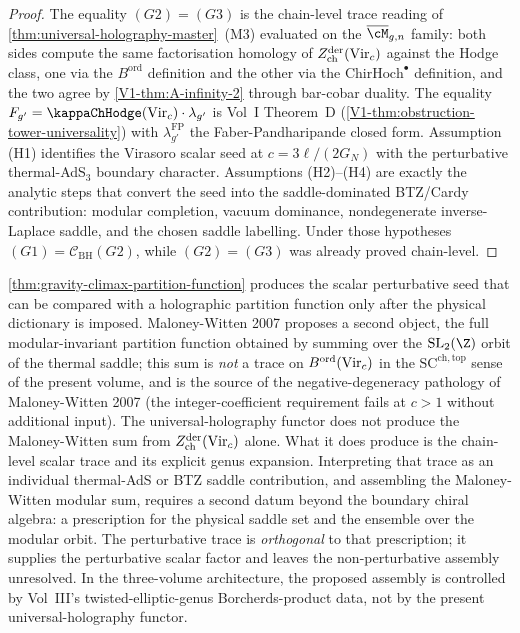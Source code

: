 \begin{proof}
The equality $(G2) = (G3)$ is the chain-level trace reading of
\cref{thm:universal-holography-master}~(M3) evaluated on the
$\overline{\cM}_{g, n}$ family: both sides compute the same factorisation
homology of $Z^{\mathrm{der}}_{\mathrm{ch}}(\mathrm{Vir}_{c})$ against the
Hodge class, one via the $B^{\mathrm{ord}}$ definition and the other
via the $\mathrm{ChirHoch}^{\bullet}$ definition, and the two agree by
\cref{V1-thm:A-infinity-2} through bar-cobar duality. The equality
	$F_{g'} = \kappaChHodge(\Vir_c) \cdot \lambda_{g'}$ is Vol~I Theorem~D
(\cref{V1-thm:obstruction-tower-universality}) with
$\lambda_{g'}^{\mathrm{FP}}$ the Faber-Pandharipande closed form.
Assumption \textup{(H1)} identifies the Virasoro scalar seed at
$c = 3\ell/(2G_N)$ with the perturbative thermal-AdS$_3$ boundary
character. Assumptions \textup{(H2)--(H4)} are exactly the analytic
steps that convert the seed into the saddle-dominated
BTZ/Cardy contribution: modular completion, vacuum dominance,
nondegenerate inverse-Laplace saddle, and the chosen saddle labelling.
Under those hypotheses \((G1)=\mathcal C_{\mathrm{BH}}(G2)\), while
\((G2)=(G3)\) was already proved chain-level.
\end{proof}

\begin{remark}
\cref{thm:gravity-climax-partition-function} produces the scalar
perturbative seed that can be compared with a holographic partition
function only after the physical dictionary is imposed. Maloney-Witten 2007
\cite{MaloneyWitten2007} proposes a second object, the full
modular-invariant partition function obtained by summing over the
$\mathrm{SL}_{2}(\Z)$ orbit of the thermal saddle; this sum is
\emph{not} a trace on $B^{\mathrm{ord}}(\mathrm{Vir}_{c})$ in the
$\mathrm{SC}^{\mathrm{ch,top}}$ sense of the present volume, and is
the source of the negative-degeneracy pathology of Maloney-Witten
2007 (the integer-coefficient requirement fails at $c > 1$
without additional input). The universal-holography functor does not produce the
Maloney-Witten sum from $Z^{\mathrm{der}}_{\mathrm{ch}}(\mathrm{Vir}_{c})$
alone. What it does produce is the chain-level scalar trace and its
explicit genus expansion. Interpreting that trace as an individual
thermal-AdS or BTZ saddle contribution, and assembling the
Maloney-Witten modular sum, requires a second datum beyond the
boundary chiral algebra: a prescription for the physical saddle set
and the ensemble over the modular orbit. The perturbative trace is
\emph{orthogonal} to that prescription; it supplies the perturbative
scalar factor and leaves the non-perturbative assembly unresolved. In
the three-volume architecture, the proposed assembly is controlled by
Vol~III's twisted-elliptic-genus Borcherds-product data, not by the
present universal-holography functor.
\end{remark}

